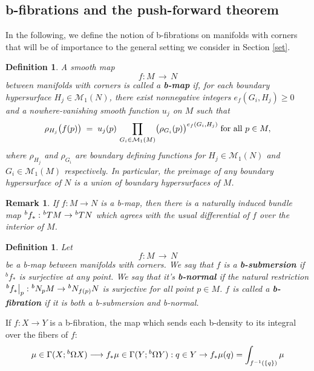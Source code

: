 \documentclass[a4paper,11pt]{article}
\newcounter{mythm}[section]
\newtheorem{defi}[mythm]{Definition}
\newtheorem{rem}[mythm]{Remark}
\newcommand\restr[2]{{%
  \left.\kern-\nulldelimiterspace %
  #1 %
  \littletaller %
  \right|_{#2} %
  }}
\newcommand{\littletaller}{\mathchoice{\vphantom{\big|}}{}{}{}}
\begin{document}
\subsection{b-fibrations and the push-forward theorem}
In the following, we define the notion of b-fibrations on manifolds with corners that will be of importance to the general setting we consider in Section \ref{set}. 
\begin{defi}
\label{def:b-map}
A smooth map 
\[
f: M \,\longrightarrow\, N
\]
between manifolds with corners is called a \textbf{b-map} if, for each boundary hypersurface $H_j \in \mathcal{M}_1(N)$, there exist nonnegative integers $e_f(G_i, H_j)\ge 0$ and a nowhere-vanishing smooth function $u_j$ on $M$ such that
\[
\rho_{H_j}\bigl(f(p)\bigr) 
\;=\; 
u_j(p)\,\prod_{G_i\in \mathcal{M}_1(M)} \bigl(\rho_{G_i}(p)\bigr)^{e_f(G_i, H_j)}
\hspace{0.1cm}
\text{for all } p \in M,
\]
where $\rho_{H_j}$ and $\rho_{G_i}$ are boundary defining functions for $H_j \in \mathcal{M}_1(N)$ and $G_i\in \mathcal{M}_1(M)$ respectively. In particular, the preimage of any boundary hypersurface of $N$ is a union of boundary hypersurfaces of $M$.
\end{defi}
\begin{rem}
   If $f : M \rightarrow N$ is a b-map, then there is a naturally induced bundle map $^{b}f_{*} : \hspace{0.01cm} ^{b}TM \rightarrow \hspace{0.01cm} ^{b}TN$  which agrees with the usual differential of $f$ over the interior of $M$.
\end{rem}
\begin{defi}
\label{def:b-fibration}
Let  
\[
f: M \,\longrightarrow\, N
\]
be a b-map between manifolds with corners. We say that $f$ is a \textbf{b-submersion} if $^{b}f_* $ is surjective at any point. We say that it's \textbf{b-normal} if the natural restriction $\restr{^{b}f_*}{p} : \hspace{0.01cm} ^{b} N_{p} M \rightarrow \hspace{0.01cm} ^{b} N_{f(p)} N$ is surjective for all point $p \in M$. $f$ is called a \textbf{b-fibration} if it is both a b-submersion and b-normal.
\end{defi}
 If $f : X \rightarrow Y$ is a b-fibration, the map which sends each b-density to its integral over the fibers of $f$: 
 $$
 \mu \in \Gamma(X; \hspace{0.01cm} ^{b}\Omega X) \longrightarrow f_{*}\mu \in \Gamma(Y; \hspace{0.01cm} ^{b}\Omega Y) : q \in Y \rightarrow f_{*}\mu (q) =\int_{f^{-1}(\{ q \})} \mu 
 $$
\end{document}
